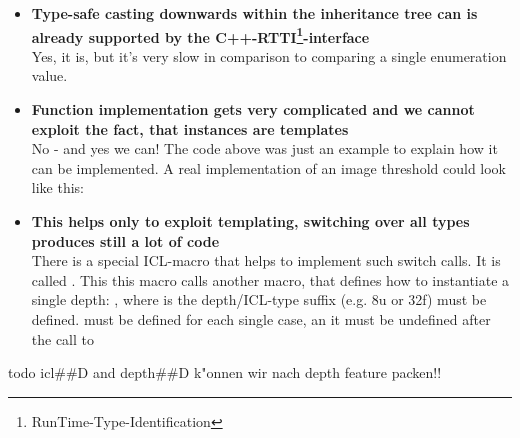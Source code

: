 \begin{itemize}
\item \textbf{Type-safe casting downwards within the inheritance tree can is already supported by the C++-RTTI\footnote{RunTime-Type-Identification}-interface}\\
Yes, it is, but it's very slow in comparison to comparing a single enumeration value.

\item \textbf{Function implementation gets very complicated and we cannot exploit the fact, that  instances are templates}\\
No - and yes we can! The code above was just an example to explain how it can be implemented. A real implementation of an image threshold could look like this:


\item \textbf{This helps only to exploit templating, switching over all types produces still a lot of code}\\
There is a special ICL-macro that helps to implement such switch calls. It is called . This this macro calls another macro, that defines how to instantiate a single depth: , where  is the depth/ICL-type suffix (e.g. 8u or 32f) must be defined.  must be defined for each single case, an it must be undefined after the call to


\end{itemize}


todo icl##D
and depth##D
k"onnen wir nach depth feature packen!!



